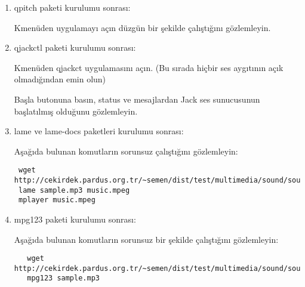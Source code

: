 \documentclass[a4paper,10pt]{article}
\begin{document}
\begin{enumerate}
\item qpitch paketi kurulumu sonrası:

Kmenüden uygulamayı açın düzgün bir şekilde çalıştığını gözlemleyin.

\item qjackctl paketi kurulumu sonrası: 

Kmenüden qjackct uygulamasını açın. (Bu sırada hiçbir ses aygıtının açık olmadığından emin olun)

Başla butonuna basın, status ve mesajlardan Jack ses sunucusunun başlatılmış olduğunu gözlemleyin.

\item lame ve lame-docs paketleri kurulumu sonrası: 

Aşağıda bulunan komutların sorunsuz çalıştığını gözlemleyin:
\begin{verbatim}
 wget http://cekirdek.pardus.org.tr/~semen/dist/test/multimedia/sound/sound/sample.mp3
 lame sample.mp3 music.mpeg
 mplayer music.mpeg
\end{verbatim}

\item mpg123 paketi kurulumu sonrası:

Aşağıda bulunan komutların sorunsuz bir şekilde çalıştığını gözlemleyin:
 \begin{verbatim}
   wget http://cekirdek.pardus.org.tr/~semen/dist/test/multimedia/sound/sound/sample.mp3
   mpg123 sample.mp3
 \end{verbatim}

\end{enumerate}
\end{document}
